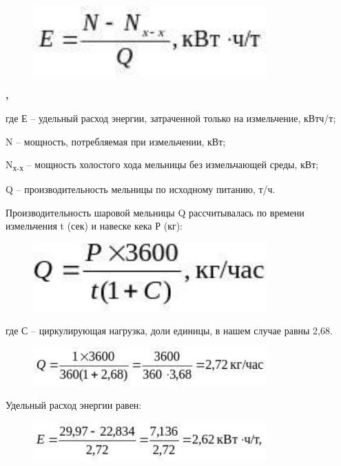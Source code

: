 \begin{figure}[H]
	\centering
	\includegraphics[width=0.8\textwidth]{assets/1036}
	\caption*{}
\end{figure}{\bfseries ,}

где Е -- удельный расход энергии, затраченной только на измельчение,
кВтч/т;

N -- мощность, потребляемая при измельчении, кВт;

N\textsubscript{х-х} -- мощность холостого хода мельницы без
измельчающей среды, кВт;

Q -- производительность мельницы по исходному питанию, т/ч.

Производительность шаровой мельницы Q рассчитывалась по времени
измельчения t (сек) и навеске кека Р (кг):

\begin{figure}[H]
	\centering
	\includegraphics[width=0.8\textwidth]{assets/1037}
	\caption*{}
\end{figure}

где С -- циркулирующая нагрузка, доли единицы, в нашем случае равны
2,68.

\begin{figure}[H]
	\centering
	\includegraphics[width=0.8\textwidth]{assets/1038}
	\caption*{}
\end{figure}

Удельный расход энергии равен:

\begin{figure}[H]
	\centering
	\includegraphics[width=0.8\textwidth]{assets/1039}
	\caption*{}
\end{figure}

